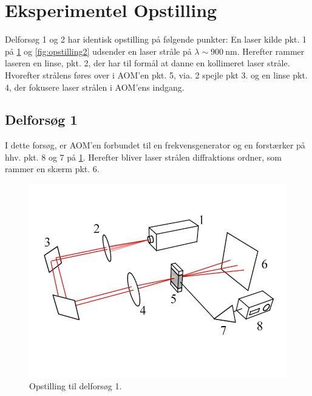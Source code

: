 \documentclass[main]{subfiles}
\begin{document}
\section{Eksperimentel Opstilling}
Delforsøg 1 og 2 har identisk opstilling på følgende punkter: En laser kilde pkt. 1 på \cref{fig:opstilling1} og \cref{fig:opstilling2} udsender en laser stråle på $\lambda \sim  \SI{900}{\nano\m} $. Herefter rammer laseren en linse, pkt. 2, der har til formål at danne en kollimeret laser stråle. Hvorefter strålens føres over i AOM'en pkt. 5, via. 2 spejle pkt 3. og en linse pkt. 4, der fokusere laser strålen i AOM'ens indgang.
\subsection{Delforsøg 1}
I dette forsøg, er AOM'en forbundet til en frekvensgenerator og en forstærker på hhv. pkt. 8 og 7 på \cref{fig:opstilling1}. Herefter bliver laser strålen diffraktions ordner, som rammer en skærm pkt. 6.
\begin{figure}[H]
    \includegraphics[width=\linewidth]{tegninger/tegning1.png}
    \caption{Opstilling til delforsøg 1.}
    \label{fig:opstilling1}
\end{figure}
\end{document}
